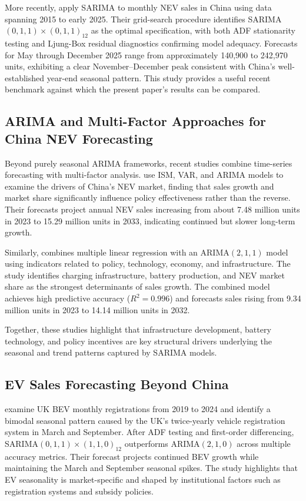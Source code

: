 \documentclass[12pt]{article}
\begin{document}
More recently, \citet{liang2025} apply SARIMA to monthly NEV sales in China using data spanning 2015 to early 2025. Their grid-search procedure identifies SARIMA$(0,1,1)\times(0,1,1)_{12}$ as the optimal specification, with both ADF stationarity testing and Ljung-Box residual diagnostics confirming model adequacy. Forecasts for May through December 2025 range from approximately 140,900 to 242,970 units, exhibiting a clear November--December peak consistent with China's well-established year-end seasonal pattern. This study provides a useful recent benchmark against which the present paper's results can be compared.

\subsection{ARIMA and Multi-Factor Approaches for China NEV Forecasting}

Beyond purely seasonal ARIMA frameworks, recent studies combine time-series forecasting with multi-factor analysis. \citet{ge2024} use ISM, VAR, and ARIMA models to examine the drivers of China’s NEV market, finding that sales growth and market share significantly influence policy effectiveness rather than the reverse. Their forecasts project annual NEV sales increasing from about 7.48 million units in 2023 to 15.29 million units in 2033, indicating continued but slower long-term growth.

Similarly, \citet{yang2024} combines multiple linear regression with an ARIMA$(2,1,1)$ model using indicators related to policy, technology, economy, and infrastructure. The study identifies charging infrastructure, battery production, and NEV market share as the strongest determinants of sales growth. The combined model achieves high predictive accuracy ($R^2 = 0.996$) and forecasts sales rising from 9.34 million units in 2023 to 14.14 million units in 2032.

Together, these studies highlight that infrastructure development, battery technology, and policy incentives are key structural drivers underlying the seasonal and trend patterns captured by SARIMA models.

\subsection{EV Sales Forecasting Beyond China}

\citet{lu2024} examine UK BEV monthly registrations from 2019 to 2024 and identify a bimodal seasonal pattern caused by the UK’s twice-yearly vehicle registration system in March and September. After ADF testing and first-order differencing, SARIMA$(0,1,1)\times(1,1,0)_{12}$ outperforms ARIMA$(2,1,0)$ across multiple accuracy metrics. Their forecast projects continued BEV growth while maintaining the March and September seasonal spikes. The study highlights that EV seasonality is market-specific and shaped by institutional factors such as registration systems and subsidy policies.
\end{document}
